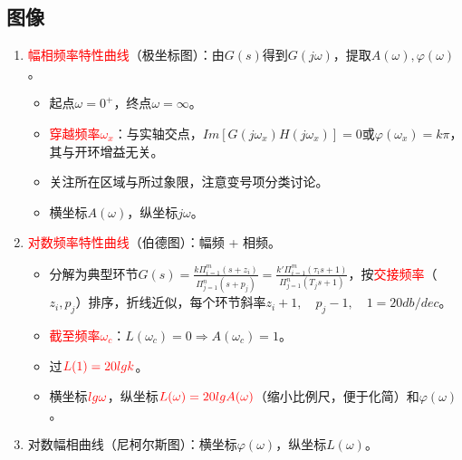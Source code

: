 \documentclass[
12pt, %
a4paper, 
oneside, %
]{scrartcl}
\begin{document}
\subsection[图像]{图像}
\begin{enumerate}
\item \textcolor{red}{幅相频率特性曲线}（极坐标图）：由$ G(s) $得到$ G(j \omega) $，提取$ A(\omega), \varphi(\omega) $。
\begin{itemize}
\item 起点$ \omega = 0^+ $，终点$ \omega = \infty $。
\item \textcolor{red}{穿越频率$ \omega_x $}：与实轴交点，$ Im[G(j \omega_x)H(j \omega_x)] = 0 $或$ \varphi(\omega_x) = k\pi $，其与开环增益无关。
\item 关注所在区域与所过象限，注意变号项分类讨论。
\item 横坐标$ A(\omega) $，纵坐标$ j \omega $。
\end{itemize}
\item \textcolor{red}{对数频率特性曲线}（伯德图）：幅频 + 相频。
\begin{itemize}
\item 分解为典型环节$ G(s) = \frac{k \Pi_{i = 1}^m (s + z_i)}{\Pi_{j = 1}^n (s + p_j)} = \frac{k' \Pi_{i = 1}^m (\tau_i s + 1)}{\Pi_{j = 1}^n (T_j s + 1)} $，按\textcolor{red}{交接频率}（$ z_i, p_j $）排序，折线近似，每个环节斜率$ z_i + 1, \quad p_j - 1 , \quad 1 = 20db/dec $。
\item \textcolor{red}{截至频率$ \omega_c $}：$ L(\omega_c) = 0 \Rightarrow A(\omega_c) = 1 $。
\item 过$ \textcolor{red}{L(1) = 20lg k} $。
\item 横坐标$ \textcolor{red}{lg \omega} $，纵坐标$ \textcolor{red}{L(\omega) = 20lg A(\omega)} $（缩小比例尺，便于化简）和$ \varphi(\omega) $。
\end{itemize}
\item 对数幅相曲线（尼柯尔斯图）：横坐标$ \varphi(\omega) $，纵坐标$ L(\omega) $。
\end{enumerate}
\end{document}
